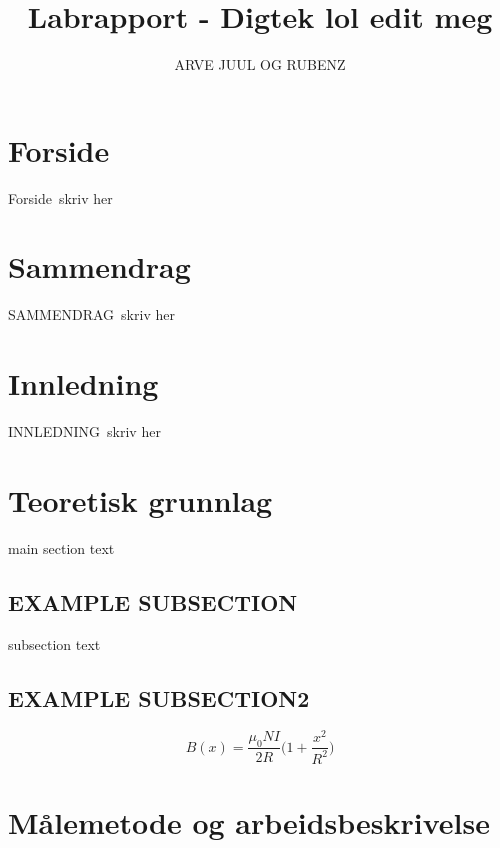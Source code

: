 \documentclass[12pt,norsk,a4paper]{article}
\begin{document}
\title{Labrapport - Digtek lol edit meg} 
\author {ARVE JUUL OG RUBENZ}

\maketitle

\clearpage



\section*{Forside} %
Forside\
skriv her
\clearpage
\setcounter{page}{1}

\section*{Sammendrag}
SAMMENDRAG\
skriv her
\clearpage %

\tableofcontents %
\clearpage

\section{Innledning} 
INNLEDNING\
skriv her
\clearpage

\section{Teoretisk grunnlag}
main section text
    \subsection{EXAMPLE SUBSECTION}
    subsection text
    \subsection{EXAMPLE SUBSECTION2}

        \begin{equation} %
            \label{eq:magnetfelt-spole} %
            B(x) = \frac{\mu_0 N I}{2R} \Bigg(1 + \frac{x^2}{R^2} \Bigg) 
        \end{equation}
\clearpage

\section{Målemetode og arbeidsbeskrivelse}
\clearpage
\end{document}
